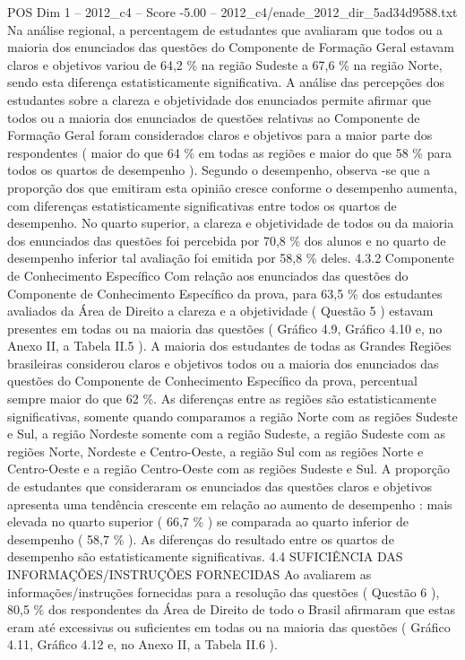 \begin{textsample}{POS Dim 1 – 2012\_c4 – Score -5.00 – 2012\_c4/enade\_2012\_dir\_5ad34d9588.txt}
Na análise regional, a percentagem de estudantes que avaliaram que todos ou a maioria dos enunciados das questões do Componente de Formação Geral estavam claros e objetivos variou de 64,2 \% na região Sudeste a 67,6 \% na região Norte, sendo esta diferença estatisticamente significativa.
A análise das percepções dos estudantes sobre a clareza e objetividade dos enunciados permite afirmar que todos ou a maioria dos enunciados de questões relativas ao Componente de Formação Geral foram considerados claros e objetivos para a maior parte dos respondentes ( maior do que 64 \% em todas as regiões e maior do que 58 \% para todos os quartos de desempenho ).
Segundo o desempenho, observa -se que a proporção dos que emitiram esta opinião cresce conforme o desempenho aumenta, com diferenças estatisticamente significativas entre todos os quartos de desempenho.
No quarto superior, a clareza e objetividade de todos ou da maioria dos enunciados das questões foi percebida por 70,8 \% dos alunos e no quarto de desempenho inferior tal avaliação foi emitida por 58,8 \% deles. 4.3.2 Componente de Conhecimento Específico Com relação aos enunciados das questões do Componente de Conhecimento Específico da prova, para 63,5 \% dos estudantes avaliados da Área de Direito a clareza e a objetividade ( Questão 5 ) estavam presentes em todas ou na maioria das questões ( Gráfico 4.9, Gráfico 4.10 e, no Anexo II, a Tabela II.5 ).
A maioria dos estudantes de todas as Grandes Regiões brasileiras considerou claros e objetivos todos ou a maioria dos enunciados das questões do Componente de Conhecimento Específico da prova, percentual sempre maior do que 62 \%.
As diferenças entre as regiões são estatisticamente significativas, somente quando comparamos a região Norte com as regiões Sudeste e Sul, a região Nordeste somente com a região Sudeste, a região Sudeste com as regiões Norte, Nordeste e Centro-Oeste, a região Sul com as regiões Norte e Centro-Oeste e a região Centro-Oeste com as regiões Sudeste e Sul.
A proporção de estudantes que consideraram os enunciados das questões claros e objetivos apresenta uma tendência crescente em relação ao aumento de desempenho : mais elevada no quarto superior ( 66,7 \% ) se comparada ao quarto inferior de desempenho ( 58,7 \% ).
As diferenças do resultado entre os quartos de desempenho são estatisticamente significativas. 4.4 SUFICIÊNCIA DAS INFORMAÇÕES/INSTRUÇÕES FORNECIDAS Ao avaliarem as informações/instruções fornecidas para a resolução das questões ( Questão 6 ), 80,5 \% dos respondentes da Área de Direito de todo o Brasil afirmaram que estas eram até excessivas ou suficientes em todas ou na maioria das questões ( Gráfico 4.11, Gráfico 4.12 e, no Anexo II, a Tabela II.6 ).

\end{textsample}
